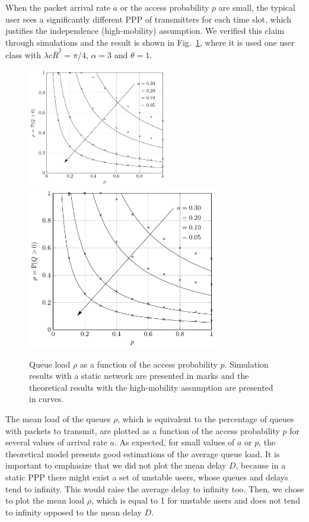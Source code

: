 When the packet arrival rate $a$ or the access probability $p$ are small, the typical user sees a significantly different PPP of transmitters for each time slot, which justifies the independence (high-mobility) assumption. We verified this claim through simulations and the result is shown in Fig.~\ref{fig:high-mobility}, where it is used one user class with ${\lambda c \overline{R}^2 = \pi/4}$, ${\alpha = 3}$ and ${\theta = 1}$.
%
\begin{figure}
    \centering
    \if{}
        \includegraphics[width=0.55\textwidth]{Figures/Ch7_high-mobility.pdf}
    \else
        \includegraphics[draft,width=0.75\textwidth]{Figures/Ch7_high-mobility.pdf}
    \fi
    \caption{Queue load $\rho$ as a function of the access probability $p$. Simulation results with a static network are presented in marks and the theoretical results with the high-mobility assumption are presented in curves.}
    \label{fig:high-mobility}
\end{figure}

The mean load of the queues $\rho$, which is equivalent to the percentage of queues with packets to transmit, are plotted as a function of the access probability $p$ for several values of arrival rate $a$. As expected, for small values of $a$ or $p$, the theoretical model presents good estimations of the average queue load.
%
It is important to emphasize that we did not plot the mean delay $D$, because in a static PPP there might exist a set of unstable users, whose queues and delays tend to infinity. This would raise the average delay to infinity too. Then, we chose to plot the mean load $\rho$, which is equal to 1 for unstable users and does not tend to infinity opposed to the mean delay $D$.

